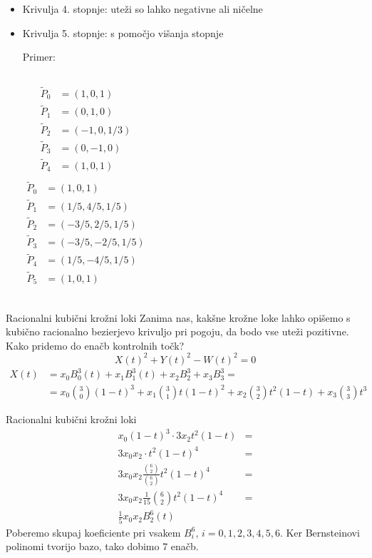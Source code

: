 \documentclass[t]{beamer}
\begin{document}
\begin{frame}
\begin{itemize}
\item Krivulja 4. stopnje: uteži so lahko negativne ali ničelne
\item Krivulja 5. stopnje: s pomočjo višanja stopnje

Primer:
\begin{columns}
	\begin{align*}
	\tilde{P}_0 &= (1,0, 1)\\
	\tilde{P}_1 &= (0, 1, 0)\\
	\tilde{P}_2 &= (-1, 0, 1/3)\\
	\tilde{P}_3 &= (0, -1, 0)\\
	\tilde{P}_4 &= (1, 0, 1) \\
	\end{align*}
    \begin{align*}
	\tilde{P}_0 &= (1,0, 1)\\
	\tilde{P}_1 &= (1/5, 4/5, 1/5)\\
	\tilde{P}_2 &= (-3/5, 2/5, 1/5)\\
	\tilde{P}_3 &= (-3/5, -2/5, 1/5)\\
	\tilde{P}_4 &= (1/5, -4/5, 1/5)\\
	\tilde{P}_5 &= (1, 0, 1) \\
	\end{align*}
\end{columns}

\end{itemize}
\end{frame}

\begin{frame}{Racionalni kubični krožni loki}
Zanima nas, kakšne krožne loke lahko opišemo s kubično racionalno bezierjevo krivuljo pri pogoju, da bodo vse uteži pozitivne.
Kako pridemo do enačb kontrolnih točk?
$$
X(t)^2 + Y(t)^2 - W(t)^2 = 0
$$
\begin{align*}
X(t) &= x_{0} B_{0}^3 (t) + x_{1} B_{1}^3 (t) + x_{2} B_{2}^3 + x_{3} B_{3}^3 = \\
&= x_{0} \binom{3}{0} (1-t)^3 + x_{1} \binom{3}{1} t(1-t)^2 + x_{2} \binom{3}{2} t^2(1-t) + x_{3} \binom{3}{3} t^3
\end{align*}
\end{frame}

\begin{frame}{Racionalni kubični krožni loki}
\begin{align*}
x_{0}(1-t)^3 \cdot 3x_{2}t^2(1-t) &= \\
3x_{0} x_{2} \cdot t^2 (1-t)^4 & = \\
3x_{0}x_{2} \frac{\binom{6}{2}}{\binom{6}{2}} t^2 (1-t)^4 &= \\
3x_{0}x_{2} \frac{1}{15} \binom{6}{2} t^2 (1-t)^4 &= \\
\frac{1}{5} x_{0}x_{2} B_{2}^6(t)
\end{align*}
Poberemo skupaj koeficiente pri vsakem $B_{i}^6$, $i=0,1,2,3,4,5,6$. Ker Bernsteinovi polinomi tvorijo bazo, tako dobimo 7 enačb.
\end{frame}
\end{document}
